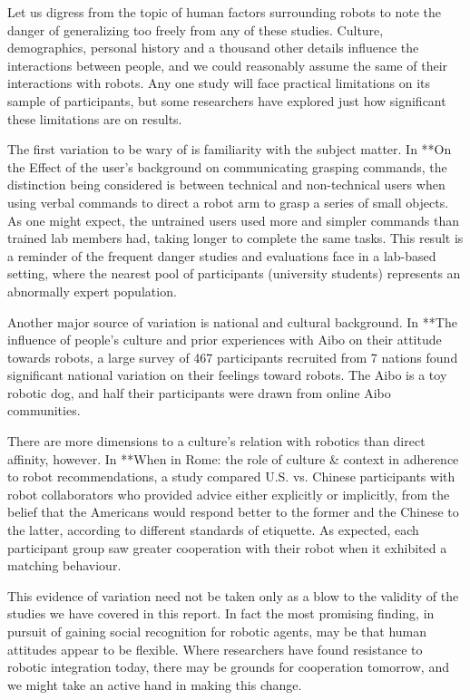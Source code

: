\documentclass{sfuthesis}
\begin{document}
Let us digress from the topic of human factors surrounding robots to note the danger of generalizing too freely from any of these studies. Culture, demographics, personal history and a thousand other details influence the interactions between people, and we could reasonably assume the same of their interactions with robots. Any one study will face practical limitations on its sample of participants, but some researchers have explored just how significant these limitations are on results.

The first variation to be wary of is familiarity with the subject matter. In **On the Effect of the user's background on communicating grasping commands, the distinction being considered is between technical and non-technical users when using verbal commands to direct a robot arm to grasp a series of small objects. As one might expect, the untrained users used more and simpler commands than trained lab members had, taking longer to complete the same tasks. This result is a reminder of the frequent danger studies and evaluations face in a lab-based setting, where the nearest pool of participants (university students) represents an abnormally expert population.

Another major source of variation is national and cultural background. In **The influence of people's culture and prior experiences with Aibo on their attitude towards robots, a large survey of 467 participants recruited from 7 nations found significant national variation on their feelings toward robots. The Aibo is a toy robotic dog, and half their participants were drawn from online Aibo communities.

There are more dimensions to a culture's relation with robotics than direct affinity, however. In **When in Rome: the role of culture & context in adherence to robot recommendations, a study compared U.S. vs. Chinese participants with robot collaborators who provided advice either explicitly or implicitly, from the belief that the Americans would respond better to the former and the Chinese to the latter, according to different standards of etiquette. As expected, each participant group saw greater cooperation with their robot when it exhibited a matching behaviour.

This evidence of variation need not be taken only as a blow to the validity of the studies we have covered in this report. In fact the most promising finding, in pursuit of gaining social recognition for robotic agents, may be that human attitudes appear to be flexible. Where researchers have found resistance to robotic integration today, there may be grounds for cooperation tomorrow, and we might take an active hand in making this change. 
\end{document}
